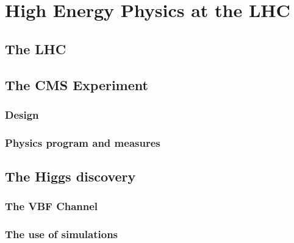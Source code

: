 \chapter{High Energy Physics at the LHC}\label{ch:plhc} %

\section{The LHC}

\section{The CMS Experiment}

\subsection{Design}

\subsection{Physics program and measures}

\section{The Higgs discovery}

\subsection{The VBF Channel}

\subsection{The use of simulations}